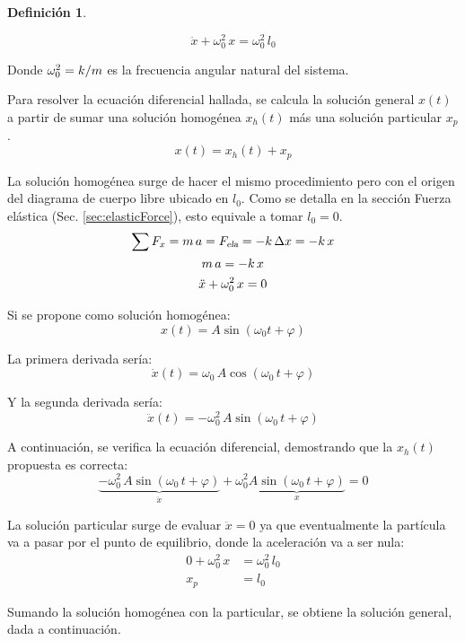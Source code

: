 \documentclass[a5paper,12pt,twoside]{book}
\newtheorem{defn}{{Definición}}[chapter]
\begin{document}
\begin{mdframed}[style=MyFrame1]
    \begin{defn}
    \end{defn}
    \begin{equation*}
        \ddot{x} + \omega_0^2 \, x = \omega_0^2 \, l_0
    \end{equation*}
\end{mdframed}

Donde $\omega_0^2 = k/m$ es la frecuencia angular natural del sistema.

Para resolver la ecuación diferencial hallada, se calcula la solución general $x(t)$ a partir de sumar una solución homogénea $x_h(t)$ más una solución particular $x_p$.
\[ x(t) = x_h(t) + x_p \]

La solución homogénea surge de hacer el mismo procedimiento pero con el origen del diagrama de cuerpo libre ubicado en $l_0$. Como se detalla en la sección Fuerza elástica (Sec. \ref{sec:elasticForce}), esto equivale a tomar $l_0 = 0$.
\begin{gather*}
    \sum F_x = m \, a = {{F}_\textsl{{ela}}} = - k \, \Delta x = -k \, x
    \\
    m \, a = - k \, x
    \\
    \ddot{x} + \omega_0^2 \, x = 0
\end{gather*}

Si se propone como solución homogénea:
\[ x(t) = A \sin{(\omega_0 t + \varphi)} \]

La primera derivada sería:
\[ \dot{x}(t) = \omega_0 \, A \cos{(\omega_0 \, t + \varphi)} \]

Y la segunda derivada sería:
\[ \ddot{x}(t) = - \omega_0^2 \, A \sin{(\omega_0 \, t + \varphi)} \]

A continuación, se verifica la ecuación diferencial, demostrando que la $x_h(t)$ propuesta es correcta:
\[
    \underbrace{- \omega_0^2 \, A \sin{(\omega_0 \, t + \varphi)}}_{\ddot{x}} + \omega_0^2 \underbrace{A \sin{(\omega_0 \, t + \varphi)}}_{x} = 0
\]

La solución particular surge de evaluar $\ddot{x} = 0$ ya que eventualmente la partícula va a pasar por el punto de equilibrio, donde la aceleración va a ser nula:
\begin{align*}
    0 + \omega_0^2 \, x &= \omega_0^2 \, l_0 
    \\
    x_p &= l_0
\end{align*}

Sumando la solución homogénea con la particular, se obtiene la solución general, dada a continuación.
\end{document}
